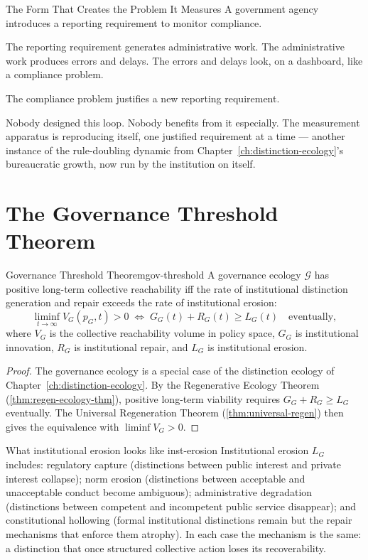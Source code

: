 \documentclass[12pt,twoside,openright]{book}
\begin{document}
\begin{distinctionaside}{The Form That Creates the Problem It
  Measures}
A government agency introduces a reporting requirement to
monitor compliance.

The reporting requirement generates administrative work. The
administrative work produces errors and delays. The errors
and delays look, on a dashboard, like a compliance problem.

The compliance problem justifies a new reporting requirement.

Nobody designed this loop. Nobody benefits from it
especially. The measurement apparatus is reproducing itself,
one justified requirement at a time --- another instance of
the rule-doubling dynamic from Chapter~\ref{ch:distinction-ecology}'s
bureaucratic growth, now run by the institution on itself.
\end{distinctionaside}

\section{The Governance Threshold Theorem}

\begin{theorem}{Governance Threshold Theorem}{gov-threshold}
  A governance ecology $\mathcal{G}$ has positive
  long-term collective reachability iff
  the rate of institutional distinction generation
  and repair exceeds the rate of institutional erosion:
  \[
    \liminf_{t\to\infty}
    V_G(p_G, t) > 0
    \;\iff\;
    G_G(t) + R_G(t) \ge L_G(t)
    \quad \text{eventually},
  \]
  where $V_G$ is the collective reachability volume in
  policy space, $G_G$ is institutional innovation,
  $R_G$ is institutional repair, and $L_G$ is
  institutional erosion.
\end{theorem}

\begin{proof}
  The governance ecology is a special case of the
  distinction ecology of Chapter~\ref{ch:distinction-ecology}.
  By the Regenerative Ecology Theorem
  (\cref{thm:regen-ecology-thm}), positive long-term
  viability requires $G_G + R_G \ge L_G$ eventually.
  The Universal Regeneration Theorem
  (\cref{thm:universal-regen}) then gives the
  equivalence with $\liminf V_G > 0$.
\end{proof}

\begin{remark}{What institutional erosion looks like}%
  {inst-erosion}
  Institutional erosion $L_G$ includes: regulatory
  capture (distinctions between public interest and
  private interest collapse); norm erosion (distinctions
  between acceptable and unacceptable conduct become
  ambiguous); administrative degradation (distinctions
  between competent and incompetent public service
  disappear); and constitutional hollowing
  (formal institutional distinctions remain but
  the repair mechanisms that enforce them atrophy).
  In each case the mechanism is the same:
  a distinction that once structured collective action
  loses its recoverability.
\end{remark}
\end{document}
